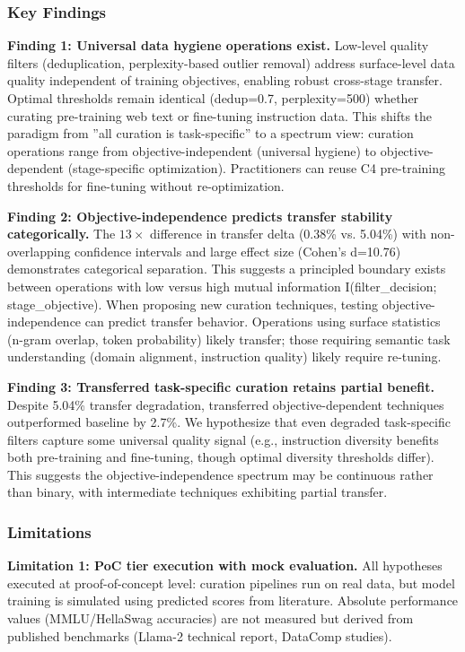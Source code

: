 
\subsubsection{Key Findings}

\textbf{Finding 1: Universal data hygiene operations exist.} Low-level quality filters (deduplication, perplexity-based outlier removal) address surface-level data quality independent of training objectives, enabling robust cross-stage transfer. Optimal thresholds remain identical (dedup=0.7, perplexity=500) whether curating pre-training web text or fine-tuning instruction data. This shifts the paradigm from ''all curation is task-specific'' to a spectrum view: curation operations range from objective-independent (universal hygiene) to objective-dependent (stage-specific optimization). Practitioners can reuse C4 pre-training thresholds for fine-tuning without re-optimization.

\textbf{Finding 2: Objective-independence predicts transfer stability categorically.} The $13\times$ difference in transfer delta (0.38\% vs. 5.04\%) with non-overlapping confidence intervals and large effect size (Cohen's d=10.76) demonstrates categorical separation. This suggests a principled boundary exists between operations with low versus high mutual information I(filter\_decision; stage\_objective). When proposing new curation techniques, testing objective-independence can predict transfer behavior. Operations using surface statistics (n-gram overlap, token probability) likely transfer; those requiring semantic task understanding (domain alignment, instruction quality) likely require re-tuning.

\textbf{Finding 3: Transferred task-specific curation retains partial benefit.} Despite 5.04\% transfer degradation, transferred objective-dependent techniques outperformed baseline by 2.7\%. We hypothesize that even degraded task-specific filters capture some universal quality signal (e.g., instruction diversity benefits both pre-training and fine-tuning, though optimal diversity thresholds differ). This suggests the objective-independence spectrum may be continuous rather than binary, with intermediate techniques exhibiting partial transfer.

\subsubsection{Limitations}

\textbf{Limitation 1: PoC tier execution with mock evaluation.} All hypotheses executed at proof-of-concept level: curation pipelines run on real data, but model training is simulated using predicted scores from literature. Absolute performance values (MMLU/HellaSwag accuracies) are not measured but derived from published benchmarks (Llama-2 technical report, DataComp studies).

